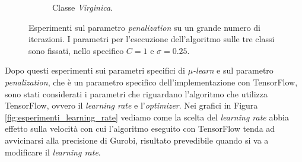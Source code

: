 \documentclass[a4paper,12pt]{report}
\begin{document}
\begin{figure}[H]
\begin{subfigure}{\textwidth}
        \caption{Classe \textit{Virginica}.}
        \label{subfig:Virginica_diffPen_10k}
    \end{subfigure}
    \caption{Esperimenti sul parametro \textit{penalization} su un grande numero di iterazioni. I parametri per l'esecuzione dell'algoritmo sulle tre classi sono fissati, nello specifico $C=1$ e $\sigma=0.25$.}
    \label{fig:esperimenti_penalization_10k}
\end{figure}

Dopo questi esperimenti sui parametri specifici di \textit{$\mu$-learn} e sul parametro \textit{penalization}, che è un parametro specifico dell'implementazione con TensorFlow, sono stati considerati i parametri che riguardano l'algoritmo che utilizza TensorFlow, ovvero il \textit{learning rate} e l'\textit{optimizer}. Nei grafici in Figura \ref{fig:esperimenti_learning_rate} vediamo come la scelta del \textit{learning rate} abbia effetto sulla velocità con cui l'algoritmo eseguito con TensorFlow tenda ad avvicinarsi alla precisione di Gurobi, risultato prevedibile quando si va a modificare il \textit{learning rate}.
\end{document}

